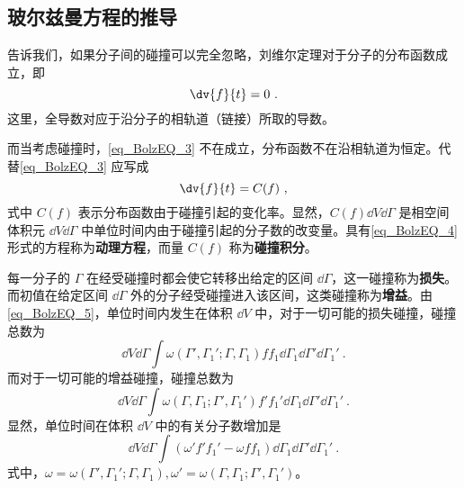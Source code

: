 \subsection{玻尔兹曼方程的推导}
 告诉我们，如果分子间的碰撞可以完全忽略，刘维尔定理对于分子的分布函数成立，即
 \begin{equation}\label{eq_BolzEQ_3}
 \dv{f}{t}=0~.
 \end{equation}
 这里，全导数对应于沿分子的相轨道（链接）所取的导数。

 而当考虑碰撞时，\autoref{eq_BolzEQ_3} 不在成立，分布函数不在沿相轨道为恒定。代替\autoref{eq_BolzEQ_3} 应写成
 \begin{equation}\label{eq_BolzEQ_4}
 \dv{f}{t}=C(f)~,
 \end{equation}
 式中 $C(f)$ 表示分布函数由于碰撞引起的变化率。显然，$C(f)\dd V\dd\Gamma$ 是相空间体积元 $\dd V\dd\Gamma$ 中单位时间内由于碰撞引起的分子数的改变量。具有\autoref{eq_BolzEQ_4} 形式的方程称为\textbf{动理方程}，而量 $C(f)$ 称为\textbf{碰撞积分}。

 每一分子的 $\Gamma$ 在经受碰撞时都会使它转移出给定的区间 $\dd\Gamma$，这一碰撞称为\textbf{损失}。而初值在给定区间 $\dd \Gamma$ 外的分子经受碰撞进入该区间，这类碰撞称为\textbf{增益}。由\autoref{eq_BolzEQ_5}，单位时间内发生在体积 $\dd V$ 中，对于一切可能的损失碰撞，碰撞总数为
 \begin{equation}
 \dd V\dd \Gamma\int\omega(\Gamma',\Gamma_1';\Gamma,\Gamma_1)ff_1\dd\Gamma_1\dd\Gamma'\dd\Gamma_1'~.
 \end{equation}
  而对于一切可能的增益碰撞，碰撞总数为
  \begin{equation}
  \dd V\dd \Gamma\int\omega(\Gamma,\Gamma_1;\Gamma',\Gamma_1')f'f_1'\dd\Gamma_1\dd\Gamma'\dd\Gamma_1'~.
  \end{equation}
  显然，单位时间在体积 $\dd V$ 中的有关分子数增加是
  \begin{equation}\label{eq_BolzEQ_6}
  \dd V\dd \Gamma\int(\omega'f'f_1'-\omega f f_1)\dd\Gamma_1\dd\Gamma'\dd\Gamma_1'~.
  \end{equation}
  式中，$\omega=\omega(\Gamma',\Gamma_1';\Gamma,\Gamma_1),\omega'=\omega(\Gamma,\Gamma_1;\Gamma',\Gamma_1')$。

